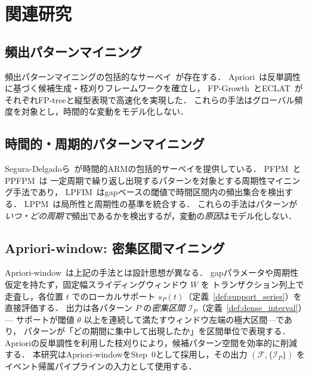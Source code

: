 \section{関連研究}\label{sec:related}

\subsection{頻出パターンマイニング}

頻出パターンマイニングの包括的なサーベイ~\cite{fournier2017survey}が存在する．
Apriori~\cite{agrawal1994fast}は反単調性に基づく候補生成・枝刈りフレームワークを確立し，
FP-Growth~\cite{han2000mining}とECLAT~\cite{zaki2000scalable}がそれぞれFP-treeと縦型表現で高速化を実現した．
これらの手法はグローバル頻度を対象とし，時間的な変動をモデル化しない．

\subsection{時間的・周期的パターンマイニング}

Segura-Delgadoら~\cite{segura2020temporal}が時間的ARMの包括的サーベイを提供している．
PFPM~\cite{tanbeer2009discovering}とPPFPM~\cite{kiran2017discovering}は
一定周期で繰り返し出現するパターンを対象とする周期性マイニング手法であり，
LPFIM~\cite{mahanta2005finding}はgapベースの閾値で時間区間内の頻出集合を検出する．
LPPM~\cite{fournier2021mining}は局所性と周期性の基準を統合する．
これらの手法はパターンが\emph{いつ・どの周期で}頻出であるかを検出するが，変動の\emph{原因}はモデル化しない．

\subsection{Apriori-window: 密集区間マイニング}

Apriori-window~\cite{dsaa2025}は上記の手法とは設計思想が異なる．
gapパラメータや周期性仮定を持たず，固定幅スライディングウィンドウ $W$ を
トランザクション列上で走査し，各位置 $t$ でのローカルサポート $s_P(t)$（定義~\ref{def:support_series}）を
直接評価する．
出力は各パターン $P$ の\emph{密集区間} $\mathcal{I}_P$（定義~\ref{def:dense_interval}）---
サポートが閾値 $\theta$ 以上を連続して満たすウィンドウ左端の極大区間---であり，
パターンが「どの期間に集中して出現したか」を区間単位で表現する．
Aprioriの反単調性を利用した枝刈りにより，候補パターン空間を効率的に削減する．
本研究はApriori-windowをStep~0として採用し，その出力 $(\mathcal{F}, \{\mathcal{I}_P\})$ を
イベント帰属パイプラインの入力として使用する．

